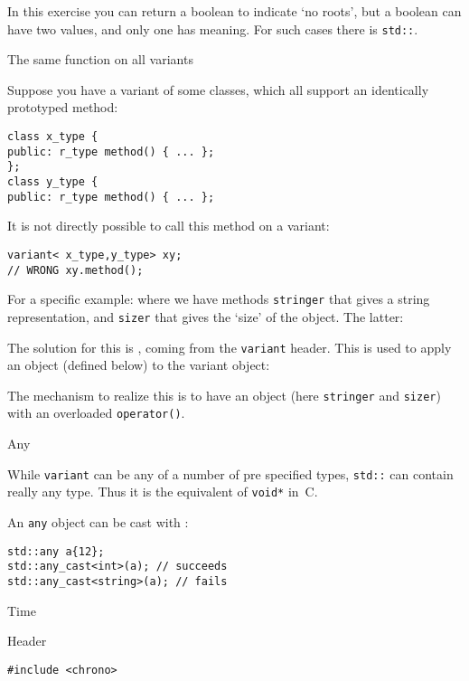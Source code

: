 In this exercise you can return a boolean to indicate `no roots', but
a boolean can have two values, and only one has meaning. For such
cases there is \lstinline{std::}.

 {The same function on all variants}

Suppose you have a variant of some classes,
which all support an identically prototyped method:
\begin{lstlisting}
class x_type {
public: r_type method() { ... };
};
class y_type {
public: r_type method() { ... };
\end{lstlisting}
It is not directly possible to call this method on a variant:
\begin{lstlisting}
variant< x_type,y_type> xy;
// WRONG xy.method();
\end{lstlisting}

For a specific example:
%
%
where we have methods
\lstinline{stringer} that gives a string representation, and
\lstinline{sizer} that gives the `size' of the object.
The latter:

The solution for this is ,
coming from the \lstinline+variant+ header.
This is used to apply an object (defined below) to the variant object:
%

The mechanism to realize this is to have an object
(here \lstinline{stringer} and \lstinline{sizer})
with an overloaded \lstinline+operator()+.

 {Any}
\label{sec:stl-any}

While \lstinline{variant} can be any of a number of pre specified
types, \lstinline{std::} can contain really any
type. Thus it is the equivalent of \lstinline{void*} in~C.

An \lstinline{any} object can be cast with :
\begin{lstlisting}
std::any a{12};
std::any_cast<int>(a); // succeeds
std::any_cast<string>(a); // fails
\end{lstlisting}




 {Time}
\label{sec:chrono}

Header
\begin{lstlisting}
#include <chrono>
\end{lstlisting}

